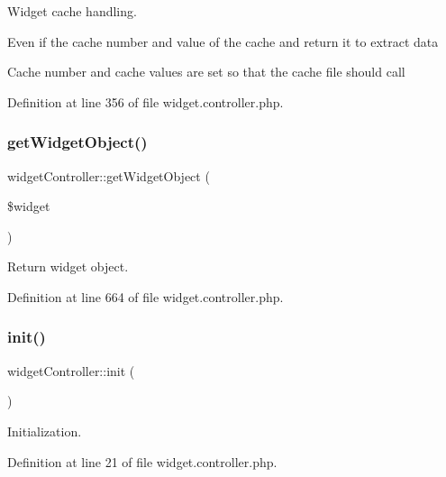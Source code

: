 Widget cache handling. 

Even if the cache number and value of the cache and return it to extract data

Cache number and cache values are set so that the cache file should call

Definition at line 356 of file widget.\+controller.\+php.

\mbox{\label{classwidgetController_a15059522aa8548d03668025d20d6d152}} 
\subsubsection{\texorpdfstring{get\+Widget\+Object()}{getWidgetObject()}}
{\footnotesize\ttfamily widget\+Controller\+::get\+Widget\+Object (\begin{DoxyParamCaption}\item[{}]{\$widget }\end{DoxyParamCaption})}



Return widget object. 



Definition at line 664 of file widget.\+controller.\+php.

\mbox{\label{classwidgetController_aa76890b678d4f18898dc1bed68730eae}} 
\subsubsection{\texorpdfstring{init()}{init()}}
{\footnotesize\ttfamily widget\+Controller\+::init (\begin{DoxyParamCaption}{ }\end{DoxyParamCaption})}



Initialization. 



Definition at line 21 of file widget.\+controller.\+php.

\mbox{\label{classwidgetController_a79adfc9bc627022de039909a2139d510}} 
